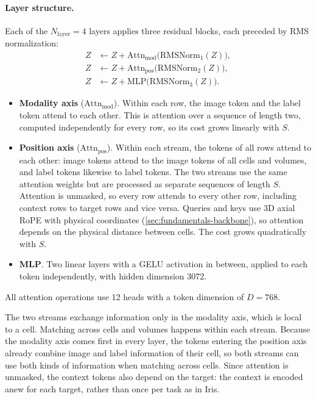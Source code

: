 \paragraph{Layer structure.}
Each of the $N_\text{layer} = 4$ layers applies three residual blocks, each preceded by
RMS normalization:
%
\begin{equation}
\begin{aligned}
  Z &\leftarrow Z + \mathrm{Attn}_{\text{mod}}\big(\mathrm{RMSNorm}_1(Z)\big), \\
  Z &\leftarrow Z + \mathrm{Attn}_{\text{pos}}\big(\mathrm{RMSNorm}_2(Z)\big), \\
  Z &\leftarrow Z + \mathrm{MLP}\big(\mathrm{RMSNorm}_3(Z)\big).
\end{aligned}
\label{eq:dual-layer}
\end{equation}
%
\begin{itemize}[leftmargin=1.4em,itemsep=0.1em]
  \item \textbf{Modality axis} ($\mathrm{Attn}_{\text{mod}}$). Within each
    row, the image token and the label token attend to each other. This is
    attention over a sequence of length two, computed independently for every
    row, so its cost grows linearly with $S$.
  \item \textbf{Position axis} ($\mathrm{Attn}_{\text{pos}}$). Within each
    stream, the tokens of all rows attend to each other: image tokens attend
    to the image tokens of all cells and volumes, and label tokens
    likewise to label tokens. The two streams use the same attention weights
    but are processed as separate sequences of length $S$. Attention is
    unmasked, so every row attends to every other row, including context rows
    to target rows and vice versa. Queries and keys use 3D axial RoPE with
    physical coordinates (\autoref{sec:fundamentals-backbone}), so attention
    depends on the physical distance between cells. The cost grows
    quadratically with $S$.
  \item \textbf{MLP}. Two linear layers with a GELU activation in between,
    applied to each token independently, with hidden dimension 3072.
\end{itemize}
%
All attention operations use 12 heads with a token dimension of $D = 768$.

The two streams exchange information only in the modality axis, which is local
to a cell. Matching across cells and volumes happens within each stream.
Because the modality axis comes first in every layer, the tokens entering the
position axis already combine image and label information of their cell, so
both streams can use both kinds of information when matching across cells.
Since attention is unmasked, the context tokens also depend on the target:
the context is encoded anew for each target, rather than once per task as in
Iris.

